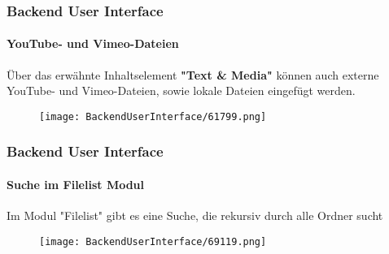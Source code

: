 \begin{frame}[fragile]
	\frametitle{Backend User Interface}
	\framesubtitle{YouTube- und Vimeo-Dateien}

	Über das erwähnte Inhaltselement \textbf{"Text \& Media"} können auch
	externe YouTube- und Vimeo-Dateien, sowie lokale Dateien eingefügt werden.

	\begin{figure}
		\texttt{[image: BackendUserInterface/61799.png]}
	\end{figure}

\end{frame}

\begin{frame}[fragile]
	\frametitle{Backend User Interface}
	\framesubtitle{Suche im Filelist Modul}

	Im Modul "Filelist" gibt es eine Suche, die rekursiv durch alle Ordner sucht

	\begin{figure}
		\texttt{[image: BackendUserInterface/69119.png]}
	\end{figure}

\end{frame}

